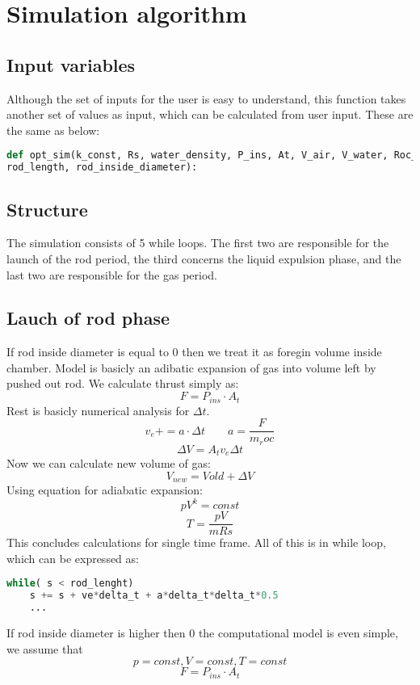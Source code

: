 \documentclass{report}
\begin{document}
\chapter{Simulation algorithm}
\section{Input variables}
Although the set of inputs for the user is easy to understand, this function takes another set of values as input, which can be calculated from user input. These are the same as below:

\begin{lstlisting}[language=Python]
def opt_sim(k_const, Rs, water_density, P_ins, At, V_air, V_water, Roc_mass, T,
rod_length, rod_inside_diameter):
\end{lstlisting}

\section{Structure}
The simulation consists of 5 while loops. The first two are responsible for the launch of the rod period, the third concerns the liquid expulsion phase, and the last two are responsible for the gas period.

\section{Lauch of rod phase}
If rod inside diameter is equal to 0 then we treat it as foregin volume inside chamber. Model is basicly an adibatic expansion of gas into volume left by pushed out rod. We calculate thrust simply as:
$$F = P_{ins} \cdot A_t$$
Rest is basicly numerical analysis for $\Delta t$.
$$v_e += a \cdot \Delta t \qquad a = \frac{F}{m_roc}$$
$$ \Delta V = A_t v_e \Delta t$$
Now we can calculate new volume of gas:
$$ V_{new} = V{old} + \Delta V$$
Using equation for adiabatic expansion:
$$ p V^k = const$$
$$ T = \frac{p V}{m Rs}$$
This concludes calculations for single time frame. All of this is in while loop, which can be expressed as:
\begin{lstlisting}[language=Python]
while( s < rod_lenght)
	s += s + ve*delta_t + a*delta_t*delta_t*0.5
	...
\end{lstlisting}
If rod inside diameter is higher then 0 the computational model is even simple, we assume that $$p=const, V=const, T=const$$
$$F=P_{ins}\cdot A_t$$
\end{document}
